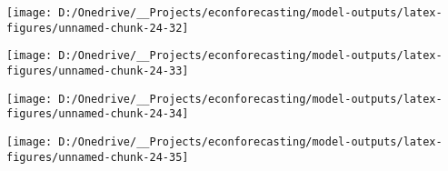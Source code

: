 \documentclass[11pt, letterpaper]{article}\usepackage[]{graphicx}\usepackage[]{color}
\begin{document}
{\centering \texttt{[image: D:/Onedrive/\_\_Projects/econforecasting/model-outputs/latex-figures/unnamed-chunk-24-32]} 

}




{\centering \texttt{[image: D:/Onedrive/\_\_Projects/econforecasting/model-outputs/latex-figures/unnamed-chunk-24-33]} 

}




{\centering \texttt{[image: D:/Onedrive/\_\_Projects/econforecasting/model-outputs/latex-figures/unnamed-chunk-24-34]} 

}




{\centering \texttt{[image: D:/Onedrive/\_\_Projects/econforecasting/model-outputs/latex-figures/unnamed-chunk-24-35]} 

}
\end{document}
